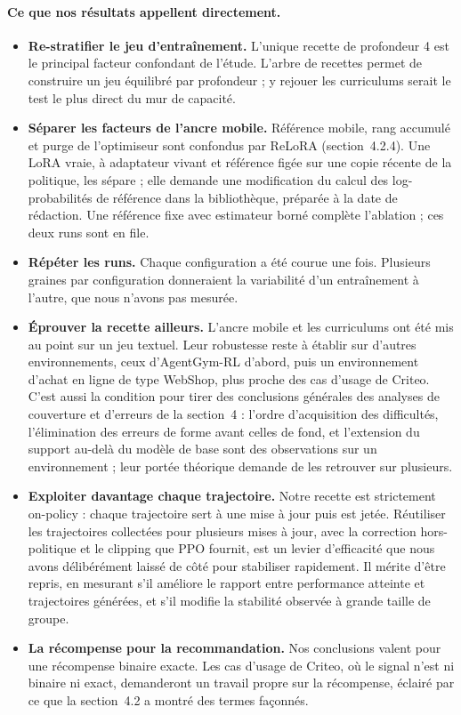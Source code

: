 \documentclass[11pt,a4paper]{article}
\begin{document}
\paragraph{Ce que nos résultats appellent directement.}
\begin{itemize}
    \item \textbf{Re-stratifier le jeu d'entraînement.} L'unique recette de profondeur 4 est le principal facteur confondant de l'étude. L'arbre de recettes permet de construire un jeu équilibré par profondeur ; y rejouer les curriculums serait le test le plus direct du mur de capacité.
    \item \textbf{Séparer les facteurs de l'ancre mobile.} Référence mobile, rang accumulé et purge de l'optimiseur sont confondus par ReLoRA (section~4.2.4). Une LoRA vraie, à adaptateur vivant et référence figée sur une copie récente de la politique, les sépare ; elle demande une modification du calcul des log-probabilités de référence dans la bibliothèque, préparée à la date de rédaction. Une référence fixe avec estimateur borné complète l'ablation ; ces deux runs sont en file.
    \item \textbf{Répéter les runs.} Chaque configuration a été courue une fois. Plusieurs graines par configuration donneraient la variabilité d'un entraînement à l'autre, que nous n'avons pas mesurée.
    \item \textbf{Éprouver la recette ailleurs.} L'ancre mobile et les curriculums ont été mis au point sur un jeu textuel. Leur robustesse reste à établir sur d'autres environnements, ceux d'AgentGym-RL d'abord, puis un environnement d'achat en ligne de type WebShop, plus proche des cas d'usage de Criteo. C'est aussi la condition pour tirer des conclusions générales des analyses de couverture et d'erreurs de la section~4 : l'ordre d'acquisition des difficultés, l'élimination des erreurs de forme avant celles de fond, et l'extension du support au-delà du modèle de base sont des observations sur un environnement ; leur portée théorique demande de les retrouver sur plusieurs.
    \item \textbf{Exploiter davantage chaque trajectoire.} Notre recette est strictement on-policy : chaque trajectoire sert à une mise à jour puis est jetée. Réutiliser les trajectoires collectées pour plusieurs mises à jour, avec la correction hors-politique et le clipping que PPO fournit, est un levier d'efficacité que nous avons délibérément laissé de côté pour stabiliser rapidement. Il mérite d'être repris, en mesurant s'il améliore le rapport entre performance atteinte et trajectoires générées, et s'il modifie la stabilité observée à grande taille de groupe.
    \item \textbf{La récompense pour la recommandation.} Nos conclusions valent pour une récompense binaire exacte. Les cas d'usage de Criteo, où le signal n'est ni binaire ni exact, demanderont un travail propre sur la récompense, éclairé par ce que la section~4.2 a montré des termes façonnés.
\end{itemize}
\end{document}
